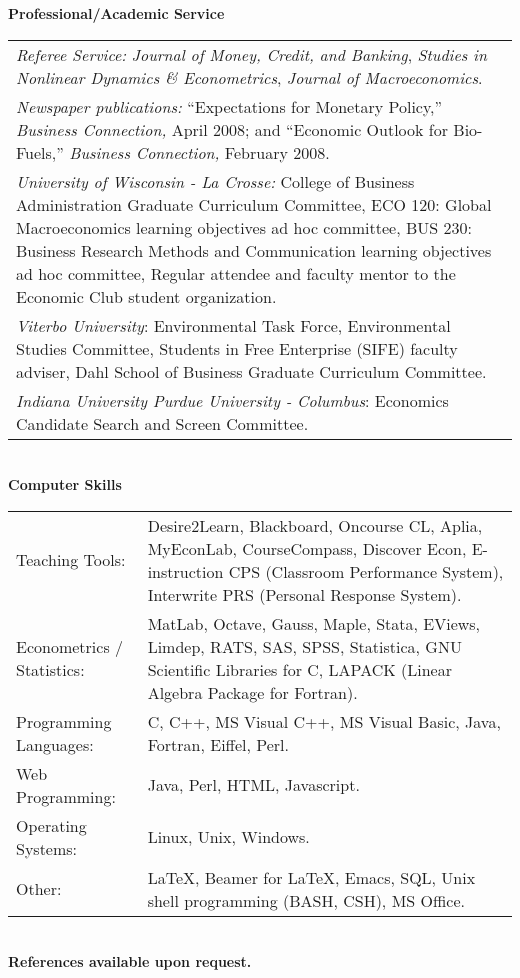\documentclass[11pt]{article}
\newcommand{\toprule}{\par\vspace*{2pt}\noindent{\hrule\hfill}\par\vspace*{1pt}}
\begin{document}
\textbf{Professional/Academic Service} \toprule
\hspace*{-0.5pc}\begin{tabular}{p{6.2in}}
\textit{Referee Service:}  \textit{Journal of Money, Credit, and Banking}, \textit{Studies in Nonlinear Dynamics \& Econometrics}, \textit{Journal of Macroeconomics}.\\

\textit{Newspaper publications:} ``Expectations for Monetary Policy,'' \textit{Business Connection,} April 2008; and ``Economic Outlook for Bio-Fuels,'' \textit{Business Connection,} February 2008. \\

\textit{University of Wisconsin - La Crosse:} College of Business Administration Graduate Curriculum Committee, ECO 120: Global Macroeconomics learning objectives ad hoc committee, BUS 230: Business Research Methods and Communication learning objectives ad hoc committee, Regular attendee and faculty mentor to the Economic Club student organization. \\

\textit{Viterbo University}:  Environmental Task Force, Environmental Studies Committee, Students in Free Enterprise (SIFE) faculty adviser, Dahl School of Business Graduate Curriculum Committee.\\

\textit{Indiana University Purdue University - Columbus}: Economics Candidate Search and Screen Committee.
\end{tabular} \\

\textbf{Computer Skills} \toprule
\hspace*{-0.5pc}\begin{tabular}{p{2in} p{4.2in}}
Teaching Tools: & Desire2Learn, Blackboard, Oncourse CL, Aplia, MyEconLab, CourseCompass, Discover Econ, E-instruction CPS (Classroom Performance System), Interwrite PRS (Personal Response System). \\
Econometrics / Statistics: & MatLab, Octave, Gauss, Maple, Stata, EViews, Limdep, RATS, SAS, SPSS, Statistica, GNU Scientific Libraries for C, LAPACK (Linear Algebra Package for Fortran). \\
Programming Languages: & C, C++, MS Visual C++, MS Visual Basic, Java, Fortran, Eiffel, Perl. \\
Web Programming: & Java, Perl, HTML, Javascript. \\
Operating Systems: & Linux, Unix, Windows.\\
Other: & \LaTeX, Beamer for \LaTeX, Emacs, SQL, Unix shell programming (BASH, CSH), MS Office. \\
\end{tabular} \\

\textbf{References available upon request.} \\
\end{document}
